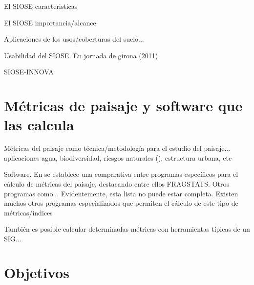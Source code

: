 El SIOSE caracteristicas

El SIOSE importancia/alcance

Aplicaciones de los usos/coberturas del suelo...

Usabilidad del SIOSE. En jornada de girona (2011)

SIOSE-INNOVA



\section{Métricas de paisaje y software que las calcula} 

Métricas del paisaje como técnica/metodología para el estudio del paisaje... aplicaciones agua, biodiversidad, riesgos naturales (), estructura urbana,  etc

Software.  En \cite{Zaragozi2012} se establece una comparativa entre programas específicos para el cálculo de métricas del paisaje, destacando entre ellos FRAGSTATS. Otros programas como... Evidentemente, esta lista no puede estar completa. Existen muchos otros programas especializados que permiten el cálculo de este tipo de métricas/índices

También es posible calcular determinadas métricas con herramientas típicas de un SIG...




\section{Objetivos}


